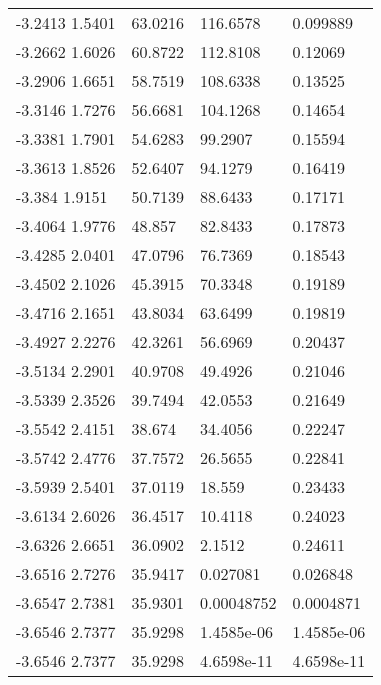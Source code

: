 \begin{tabular}{llll}
-3.2413      1.5401 & 63.0216 & 116.6578 & 0.099889 \\ 
-3.2662      1.6026 & 60.8722 & 112.8108 & 0.12069 \\ 
-3.2906      1.6651 & 58.7519 & 108.6338 & 0.13525 \\ 
-3.3146      1.7276 & 56.6681 & 104.1268 & 0.14654 \\ 
-3.3381      1.7901 & 54.6283 & 99.2907 & 0.15594 \\ 
-3.3613      1.8526 & 52.6407 & 94.1279 & 0.16419 \\ 
-3.384      1.9151 & 50.7139 & 88.6433 & 0.17171 \\ 
-3.4064      1.9776 & 48.857 & 82.8433 & 0.17873 \\ 
-3.4285      2.0401 & 47.0796 & 76.7369 & 0.18543 \\ 
-3.4502      2.1026 & 45.3915 & 70.3348 & 0.19189 \\ 
-3.4716      2.1651 & 43.8034 & 63.6499 & 0.19819 \\ 
-3.4927      2.2276 & 42.3261 & 56.6969 & 0.20437 \\ 
-3.5134      2.2901 & 40.9708 & 49.4926 & 0.21046 \\ 
-3.5339      2.3526 & 39.7494 & 42.0553 & 0.21649 \\ 
-3.5542      2.4151 & 38.674 & 34.4056 & 0.22247 \\ 
-3.5742      2.4776 & 37.7572 & 26.5655 & 0.22841 \\ 
-3.5939      2.5401 & 37.0119 & 18.559 & 0.23433 \\ 
-3.6134      2.6026 & 36.4517 & 10.4118 & 0.24023 \\ 
-3.6326      2.6651 & 36.0902 & 2.1512 & 0.24611 \\ 
-3.6516      2.7276 & 35.9417 & 0.027081 & 0.026848 \\ 
-3.6547      2.7381 & 35.9301 & 0.00048752 & 0.0004871 \\ 
-3.6546      2.7377 & 35.9298 & 1.4585e-06 & 1.4585e-06 \\ 
-3.6546      2.7377 & 35.9298 & 4.6598e-11 & 4.6598e-11 \\ 
\hline 
\end{tabular}
